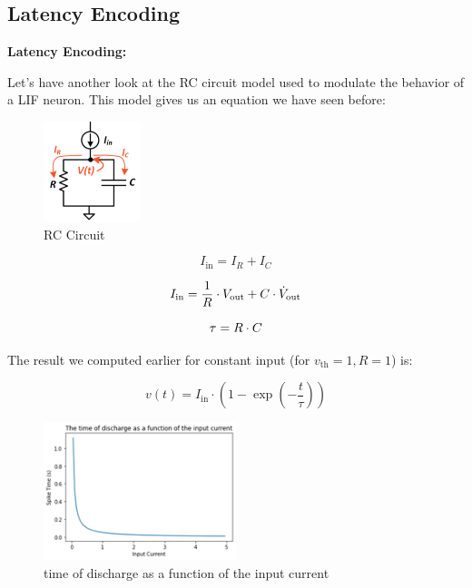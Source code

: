 \subsection{Latency Encoding}

\textbf{Latency Encoding:}

Let's have another look at the RC circuit model used to modulate the behavior of a LIF neuron. This model gives us an equation we have seen before:

\begin{figure}[H]
    \centering
    \includegraphics[width=0.25\textwidth]{methods/spike-encoding/graphs/LIF-circuit.png}
    \caption{RC Circuit}
    \label{image:RC_circuit}
\end{figure}

\begin{equation}
    I_{\text{in}} = I_R + I_C
\end{equation}

\begin{equation}
    I_{\text{in}} = \frac{1}{R} \cdot V_{\text{out}} + C \cdot \dot{V}_{\text{out}} \notag
\end{equation}

\begin{equation}
    \tau = R \cdot C \notag
\end{equation}


The result we computed earlier for constant input (for $v_{\text{th}} = 1, R = 1$) is:

\begin{equation}
    v(t) = I_{\text{in}} \cdot \left(1 - \exp\left(-\frac{t}{\tau}\right)\right)
\end{equation}

\begin{figure}[H]
    \centering
    \includegraphics[width=0.5\textwidth]{methods/spike-encoding/graphs/exponential-decay.png}
    \caption{time of discharge as a function of the input current}
    \label{image:exponential_decay}
\end{figure}

